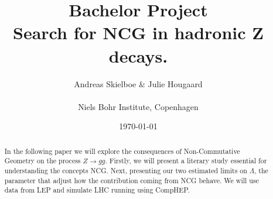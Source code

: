 \documentclass[11pt,a4paper,titlepage]{article}
\numberwithin{equation}{section}
\begin{document}
\title{Bachelor Project\\Search for NCG in hadronic Z decays.}
\author{Andreas Skielboe \& Julie Hougaard \\ \\ Niels Bohr Institute, Copenhagen}
\date{\today}
\maketitle
{}

\begin{abstract}
In the following paper we will explore the consequences of Non-Commutative Geometry on the process $Z \rightarrow gg$. Firstly, we will present a literary study essential for understanding the concepts NCG. Next, presenting our two estimated limits on $\Lambda$, the parameter that adjust how the contribution coming from NCG behave. We will use data from LEP and simulate LHC running using CompHEP.
\end{abstract}

\clearpage
\tableofcontents
\clearpage





\clearpage












\clearpage


\clearpage



\end{document}

